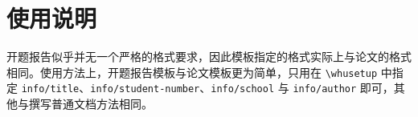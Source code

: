 \documentclass[type=opening]{whu-thesis}
\begin{document}
\section{使用说明}
开题报告似乎并无一个严格的格式要求，因此模板指定的格式实际上与论文的格式相同。使用方法上，开题报告模板与论文模板更为简单，只用在 \verb|\whusetup| 中指定 \verb|info/title|、\verb|info/student-number|、\verb|info/school| 与 \verb|info/author| 即可，其他与撰写普通文档方法相同。\cite{江泽民1989能源发展趋势及主要节能措施}

\nocite{*}
\end{document}
